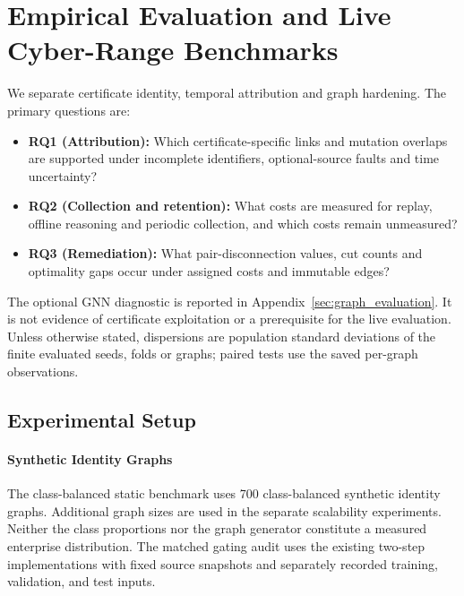 \section{Empirical Evaluation and Live Cyber-Range Benchmarks}
\label{sec:evaluation}

We separate certificate identity, temporal attribution and graph hardening. The primary questions are:
\begin{itemize}
\item \textbf{RQ1 (Attribution):} Which certificate-specific links and mutation overlaps are supported under incomplete identifiers, optional-source faults and time uncertainty?
\item \textbf{RQ2 (Collection and retention):} What costs are measured for replay, offline reasoning and periodic collection, and which costs remain unmeasured?
\item \textbf{RQ3 (Remediation):} What pair-disconnection values, cut counts and optimality gaps occur under assigned costs and immutable edges?
\end{itemize}
The optional GNN diagnostic is reported in Appendix~\ref{sec:graph_evaluation}. It is not evidence of certificate exploitation or a prerequisite for the live evaluation. Unless otherwise stated, dispersions are population standard deviations of the finite evaluated seeds, folds or graphs; paired tests use the saved per-graph observations.

\subsection{Experimental Setup}
\paragraph{Synthetic Identity Graphs} The class-balanced static benchmark uses 700 class-balanced synthetic identity graphs. Additional graph sizes are used in the separate scalability experiments. Neither the class proportions nor the graph generator constitute a measured enterprise distribution. The matched gating audit uses the existing two-step implementations with fixed source snapshots and separately recorded training, validation, and test inputs.

